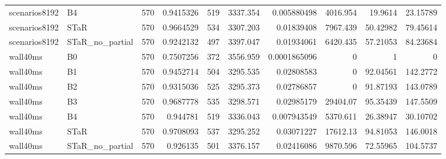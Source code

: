 \begin{tabular}{llrrrrrrrr}
scenarios8192 & B4 & 570 & 0.9415326 & 519 & 3337.354 & 0.005880498 & 4016.954 & 19.9614 & 23.15789 \\
scenarios8192 & STaR & 570 & 0.9664529 & 534 & 3307.203 & 0.01839408 & 7967.439 & 50.42982 & 79.45614 \\
scenarios8192 & STaR\_no\_partial & 570 & 0.9242132 & 497 & 3397.047 & 0.01934061 & 6420.435 & 57.21053 & 84.23684 \\
wall40ms & B0 & 570 & 0.7507256 & 372 & 3556.959 & 0.0001865096 & 0 & 1 & 0 \\
wall40ms & B1 & 570 & 0.9452714 & 504 & 3295.535 & 0.02808583 & 0 & 92.04561 & 142.2772 \\
wall40ms & B2 & 570 & 0.9315036 & 525 & 3295.373 & 0.02786857 & 0 & 91.87193 & 143.0789 \\
wall40ms & B3 & 570 & 0.9687778 & 535 & 3298.571 & 0.02985179 & 29404.07 & 95.35439 & 147.5509 \\
wall40ms & B4 & 570 & 0.944781 & 519 & 3336.043 & 0.007943549 & 5370.611 & 26.38947 & 30.10702 \\
wall40ms & STaR & 570 & 0.9708093 & 537 & 3295.252 & 0.03071227 & 17612.13 & 94.81053 & 146.0018 \\
wall40ms & STaR\_no\_partial & 570 & 0.926135 & 501 & 3376.157 & 0.02416086 & 9870.596 & 72.55965 & 104.5737 \\
\hline
\end{tabular}
